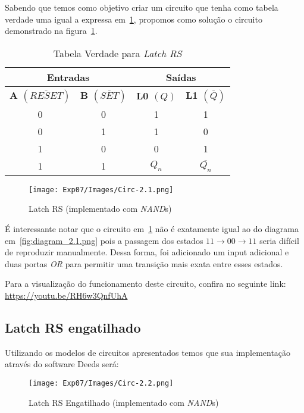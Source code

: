 \documentclass[12pt]{article}
\begin{document}
Sabendo que temos como objetivo criar um circuito que tenha como tabela verdade
uma igual a expressa em~\ref{tab:truth_table_latch_rs}, propomos como solução o
circuito demonstrado na figura~\ref{fig:Circ-2.1.png}.

\begin{table}[H]
    \centering
    \caption{Tabela Verdade para \emph{Latch RS}}
    \begin{tabular}{|c|c||c|c|}\hline
      \multicolumn{2}{|c||}{Entradas} & \multicolumn{2}{|c|}{Saídas} \\\hline
      \textbf{A $(\overline{RESET})$} & \textbf{B $(\overline{SET})$} & \textbf{L0 $(Q)$} & \textbf{L1 $(\overline{Q})$} \\\hline
      0 & 0 & 1 & 1 \\\hline
      0 & 1 & 1 & 0 \\\hline
      1 & 0 & 0 & 1 \\\hline
      1 & 1 & $Q_{n}$ & $\overline{Q_{n}}$ \\\hline
    \end{tabular}\label{tab:truth_table_latch_rs}
\end{table}

\begin{figure}[H]
  \centering
  \texttt{[image: Exp07/Images/Circ-2.1.png]}
  \caption{Latch RS (implementado com \emph{NAND}s)}\label{fig:Circ-2.1.png}
\end{figure}

É interessante notar que o circuito em~\ref{fig:Circ-2.1.png} não é exatamente
igual ao do diagrama em~\ref{fig:diagram_2.1.png} pois a passagem dos estados
$11 \rightarrow 00 \rightarrow 11$ seria difícil de reproduzir manualmente.
Dessa forma, foi adicionado um input adicional e duas portas \emph{OR} para
permitir uma transição mais exata entre esses estados.

Para a visualização do funcionamento deste circuito, confira no seguinte link:
\href{https://youtu.be/RH6w3QnfUhA}{https://youtu.be/RH6w3QnfUhA}

\subsection{Latch RS engatilhado}\label{sec:2.2}

Utilizando os modelos de circuitos apresentados temos que sua implementação
através do software Deeds será:

\begin{figure}[H]
  \centering
  \texttt{[image: Exp07/Images/Circ-2.2.png]}
  \caption{Latch RS Engatilhado (implementado com \emph{NAND}s)}\label{fig:LatchRS-Engatilhado.png}
\end{figure}
\end{document}
